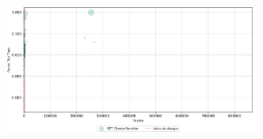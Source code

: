 \begin{apendicesenv}
\begin{figure}[htbp!]
\begin{subfigure}[t]{0.5\textwidth}
        \includegraphics[width=1\textwidth, height=120pt]{USPSC-img/output/cropped/0-dos_hping3-rttp.png}
    \end{subfigure}%
\end{figure}


\end{apendicesenv}
